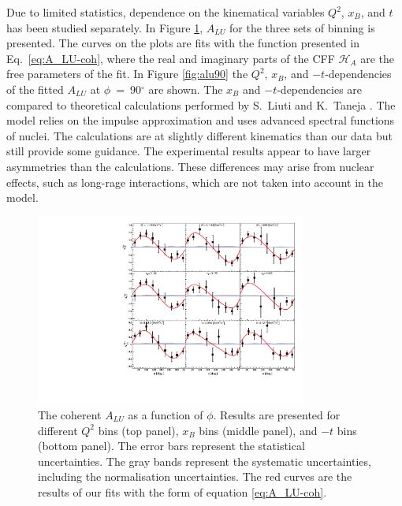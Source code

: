\documentclass[twocolumn,nofootinbib,showpacs,prl,superscriptaddress,secnumarabic,amssymb,nobibnotes,aps,floatfix]{revtex4}
\begin{document}
Due to limited statistics, dependence on the kinematical variables $Q^2$, 
$x_B$, and $t$ has been studied separately. In Figure \ref{fig:alu}, $A_{LU}$ 
for the three sets of binning is presented. The curves on the plots are fits 
with the function presented in Eq.~\ref{eq:A_LU-coh}, where the real and 
imaginary parts of the CFF $\mathcal{H}_{A}$ are the free parameters of the fit. 
In Figure \ref{fig:alu90} the $Q^2$, $x_{B}$, and $-t$-dependencies of the 
fitted $A_{LU}$ at $\phi$~=~90$^{\circ}$ are shown. The $x_{B}$ and 
$-t$-dependencies are compared to theoretical calculations performed by 
S.~Liuti and K.~Taneja \cite{simonetta_2}. The model relies on the impulse 
approximation and uses advanced spectral functions of nuclei. The calculations 
are at slightly different kinematics than our data but still provide some 
guidance. The experimental results appear to have larger asymmetries than the 
calculations. These differences may arise from nuclear effects, such as 
long-rage interactions, which are not taken into account in the model.

\begin{figure}[tb]
\includegraphics[width=8.9cm]{figs/coherent-ALU.pdf}
\caption{The coherent $A_{LU}$ as a function of $\phi$. Results are presented
   for different $Q^{2}$ bins (top panel), $x_{B}$ bins (middle panel), and 
   $-t$ bins (bottom panel).  
   The error bars represent the statistical uncertainties. The gray 
   bands represent the systematic uncertainties, including the normalisation 
   uncertainties. The red curves are the results of our fits with the form of 
   equation \ref{eq:A_LU-coh}.}
\label{fig:alu}
\end{figure}
\end{document}
